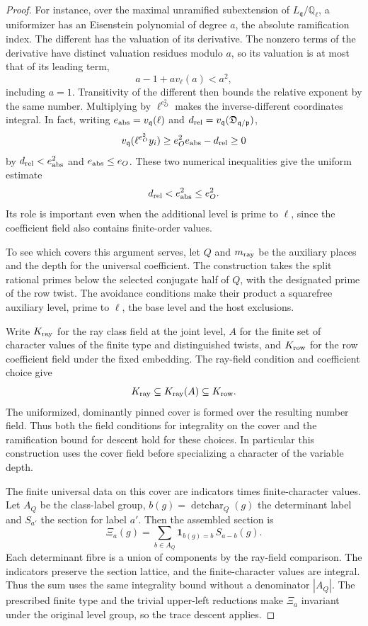 \begin{proof}
For instance, over the maximal unramified subextension
of \(L_{\mathfrak q}/\mathbb Q_\ell\), a uniformizer has
an Eisenstein polynomial of degree \(a\), the absolute
ramification index. The different has the valuation of
its derivative. The nonzero terms of the derivative
have distinct valuation residues modulo \(a\), so its
valuation is at most that of its leading term,
\[
 a-1+a v_\ell(a)<a^2,
\]
including \(a=1\).
Transitivity of the different then bounds the relative
exponent by the same number. Multiplying by
 \(\ell^{e_O^2}\) makes the inverse-different coordinates
integral. In fact, writing \(e_{\rm abs}=v_{\mathfrak q}(\ell)\)
and \(d_{\rm rel}=v_{\mathfrak q}(\mathfrak D_{\mathfrak q/\mathfrak p})\),
\[
 v_{\mathfrak q}(\ell^{e_O^2}y_i)
       \ge e_O^2 e_{\rm abs}-d_{\rm rel}\ge0
\]
by \(d_{\rm rel}<e_{\rm abs}^2\) and \(e_{\rm abs}\le e_O\). These two numerical inequalities give the uniform estimate
\[
 d_{\rm rel}<e_{\rm abs}^2\le e_O^2.
\]
Its role is important even
when the additional level is prime to \(\ell\), since
the coefficient field also contains finite-order values.

To see which covers this argument serves, let \(Q\) and
\(m_{\rm ray}\) be the auxiliary places and the depth
for the universal coefficient. The construction takes
the split rational primes below the selected conjugate
half of \(Q\), with the designated prime of the row twist.
The avoidance conditions make their product a squarefree
auxiliary level, prime to \(\ell\), the base level and the
host exclusions.

Write \(K_{\rm ray}\) for the ray class field at the joint level, \(A\) for the finite set of character values of the finite type and distinguished twists, and \(K_{\rm row}\) for the row coefficient field under the fixed embedding. The ray-field condition and coefficient choice give
\[
 K_{\rm ray}\subseteq K_{\rm ray}(A)\subseteq K_{\rm row}.
\]
The uniformized, dominantly
pinned cover is formed over the resulting number
field. Thus both the field conditions for integrality
on the cover and the ramification bound for descent
hold for these choices. In particular this construction
uses the cover field before specializing a character of
the variable depth.

The finite universal data on this cover are indicators
times finite-character values. Let \(A_Q\) be the class-label
group, \(b(g)=\operatorname{detchar}_Q(g)\) the determinant
label and \(S_{a'}\) the section for label \(a'\). Then the
assembled section is
\[
              \Xi_a(g)=\sum_{b\in A_Q}
                     \mathbf1_{b(g)=b}\,S_{a-b}(g).
\]
Each determinant fibre is a union of components by the
ray-field comparison. The indicators preserve the section
lattice, and the finite-character values are integral. Thus
the sum uses the same integrality bound without a denominator
\(|A_Q|\). The prescribed finite type and the trivial
upper-left reductions make \(\Xi_a\) invariant under the
original level group, so the trace descent applies.


\end{proof}
